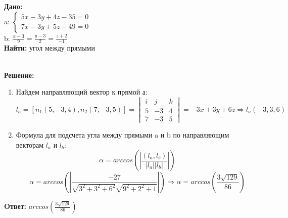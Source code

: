\documentclass{article}
\begin{document}
\begin{minipage}[t]{0.45\textwidth}

\textbf{Дано:}\\ 

a: \begin{math}
  \begin{cases}
    5x-3y+4z-35 = 0\\ 
    7x - 3y + 5z - 49 = 0 
  \end{cases}
\end{math}\\
b: \begin{math}  
\frac{x-3}{9} = \frac{y-3}{2} = \frac{z+2}{-1}
\end{math}\\
\textbf{Найти: }угол между прямыми
\end{minipage}
\begin{minipage}[t]{0.45\textwidth}
  \vspace{-\baselineskip} %

\begin{center}
\end{center}
\end{minipage}
\\
\textbf{Решение:}
\begin{enumerate}
  \item Найдем направляющий вектор к прямой а:
    \[
      l_a = [n_1(5,-3,4),n_2(7,-3,5)] = 
      \begin{vmatrix}
        i &j &k\\ 
        5 &-3 &4\\ 
        7 &-3 &5 
      \end{vmatrix} = -3x + 3y + 6z \Rightarrow l_a(-3,3,6)
    \]
    
    
    \item Формула для подсчета угла между прямыми a и b по направляющим векторам $l_a$ и $l_b$: 
      \[
        \alpha = arccos(\left|\frac{(l_a,l_b)}{|l_a||l_b|} \right|)
      \]
      \[
        \alpha = arccos(\left|\frac{-27}{\sqrt{3^2+3^2+6^2}\sqrt{9^2 + 2^2 + 1}}\right|) \Rightarrow \alpha = arccos(\frac{3\sqrt{129}}{86})
      \]
\end{enumerate}

\textbf{Oтвет: }$ arccos(\frac{3\sqrt{129}}{86})$ 
\end{document}
